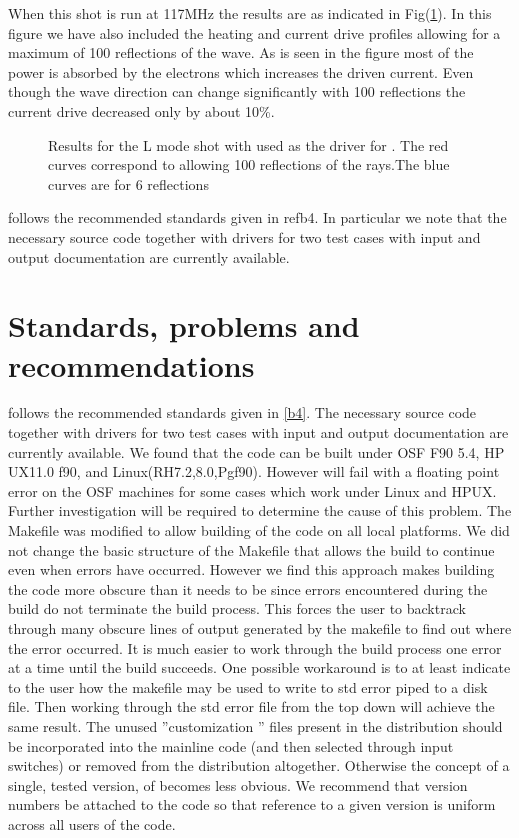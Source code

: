     When this shot is run at 117MHz the results are as indicated in 
   Fig(\ref{Figbwav3e}).  In this figure we have also included the
  heating and current drive profiles allowing for a maximum of 100
  reflections of the wave. As is seen in the figure most of the power
  is absorbed by the electrons which increases the driven current.
   Even though  the wave direction can change significantly
   with 100 reflections the current drive decreased only by about 10\%.
 \begin{figure}[hbt]
 \centering   
\begin{narrow}{-0.40in}{0in}
 \mbox{}
\end{narrow}
 \caption{Results for the L mode shot with \ot used as the driver for
   \ct. The red curves correspond to allowing 100 reflections of the
   rays.The blue curves are for 6 reflections }
  \label{Figbwav3e}
 \end{figure}

\ct follows  the recommended standards given in ref{b4}.
 In particular we note that the necessary source code together with
 drivers for two test cases with input and output documentation
 are currently available. 
 



\section{Standards, problems and recommendations} \label{prob}

\ct follows  the recommended standards given in \ref{b4}.
 The necessary source code together with
 drivers for two test cases with input and output documentation
 are currently available.    We found that the code can be built under
   OSF F90 5.4, HP UX11.0 f90, and Linux(RH7.2,8.0,Pgf90). 
   However \ct will fail with
   a floating point error on the OSF machines for some  cases  which
   work under Linux and HPUX. Further investigation will be required to
   determine the cause of this problem.  
The Makefile was modified to allow building of
the code on all local platforms. We  did not change the basic structure of
the Makefile that allows the build to continue even when errors have
occurred. However we find this approach makes building the code more
obscure  than it needs to be since errors encountered during the
build do not terminate the build process. This  forces the user to
backtrack  through many obscure 
lines of output generated by the makefile to find out where the
error occurred. It is much easier to work through the build process 
one error at a time until the build succeeds. One possible workaround
is to at least indicate to the user  how the makefile may be used to
write to std error piped to a disk file. Then working through the
std error file from the top down will achieve the same result.
 The unused ''customization '' files present in the distribution
 should be incorporated into the mainline code
 (and then selected through input switches) or removed from the distribution altogether. Otherwise the concept
 of a single, tested version, of \ct becomes less obvious.
 We recommend that 
 version  numbers be attached to the code so that reference to a
 given version is uniform across all users of the code.

